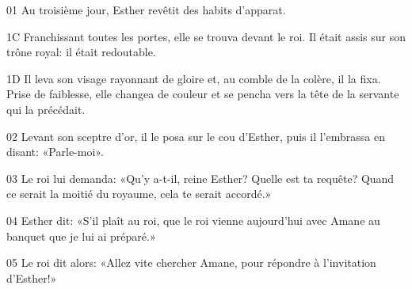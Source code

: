 01 Au troisième jour, Esther revêtit des habits d’apparat.

1C Franchissant toutes les portes, elle se trouva devant le roi. Il était assis sur son trône royal: il était redoutable.

1D Il leva son visage rayonnant de gloire et, au comble de la colère, il la fixa. Prise de faiblesse, elle changea de couleur et se pencha vers la tête de la servante qui la précédait.

02 Levant son sceptre d’or, il le posa sur le cou d’Esther, puis il l’embrassa en disant: «Parle-moi».

03 Le roi lui demanda: «Qu’y a-t-il, reine Esther? Quelle est ta requête? Quand ce serait la moitié du royaume, cela te serait accordé.»

04 Esther dit: «S’il plaît au roi, que le roi vienne aujourd’hui avec Amane au banquet que je lui ai préparé.»

05 Le roi dit alors: «Allez vite chercher Amane, pour répondre à l’invitation d’Esther!»